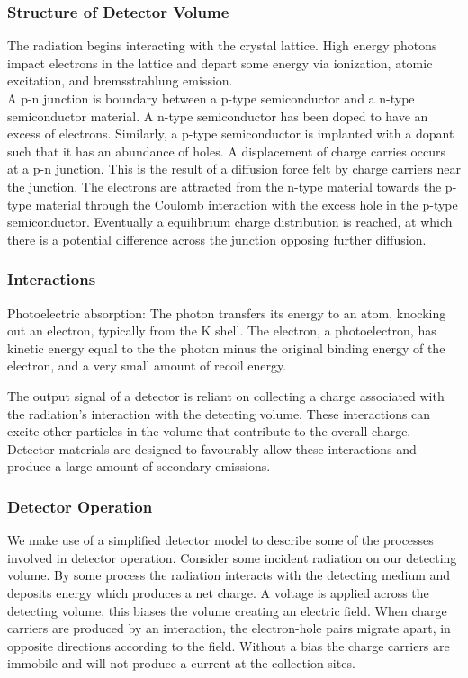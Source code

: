 \documentclass[12pt]{article}
\begin{document}
\begin{doublespacing}
\subsubsection{Structure of Detector Volume}

The radiation begins interacting with the crystal lattice. 
High energy photons impact electrons in the lattice and depart some energy via ionization, atomic excitation, and bremsstrahlung emission. 
\\

A p-n junction is boundary between a p-type semiconductor and a n-type semiconductor material. 
A n-type semiconductor has been doped to have an excess of electrons. 
Similarly, a p-type semiconductor is implanted with a dopant such that it has an abundance of holes. 
A displacement of charge carries occurs at a p-n junction. 
This is the result of a diffusion force felt by charge carriers near the junction. 
The electrons are attracted from the n-type material towards the p-type material through the Coulomb interaction with the excess hole in the p-type semiconductor. 
Eventually a equilibrium charge distribution is reached, at which there is a potential difference across the junction opposing further diffusion.
\\


\subsubsection{Interactions}
Photoelectric absorption: The photon transfers its energy to an atom, knocking out an electron, typically from the K shell. 
The electron, a photoelectron, has kinetic energy equal to the the photon minus the original binding energy of the electron, and a very small amount of recoil energy.

The output signal of a detector is reliant on collecting a charge associated with the radiation's interaction with the detecting volume. 
These interactions can excite other particles in the volume that contribute to the overall charge.
Detector materials are designed to favourably allow these interactions and produce a large amount of secondary emissions. 
\\


\subsubsection{Detector Operation}
We make use of a simplified detector model to describe some of the processes involved in detector operation.
Consider some incident radiation on our detecting volume. 
By some process the radiation interacts with the detecting medium and deposits energy which produces a net charge. 
A voltage is applied across the detecting volume, this biases the volume creating an electric field. 
When charge carriers are produced by an interaction, the electron-hole pairs migrate apart, in opposite directions according to the field. 
Without a bias the charge carriers are immobile and will not produce a current at the collection sites.


\end{doublespacing}
\end{document}
